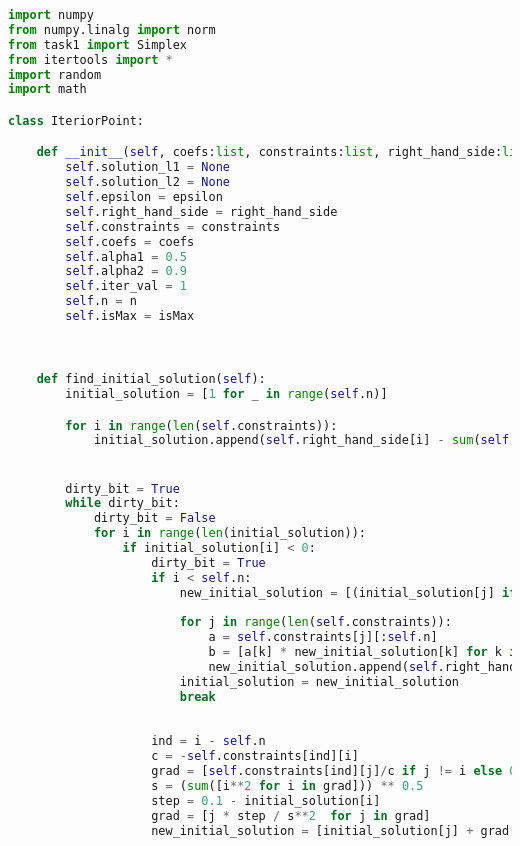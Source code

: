 \documentclass[12pt, legalpaper]{exam}
\begin{document}
\begin{lstlisting}[language=Python, caption=Программа на Python, label=lst:python-code]
import numpy
from numpy.linalg import norm
from task1 import Simplex
from itertools import *
import random
import math

class IteriorPoint:

    def __init__(self, coefs:list, constraints:list, right_hand_side:list, epsilon:int, n:int, isMax:bool):
        self.solution_l1 = None
        self.solution_l2 = None
        self.epsilon = epsilon
        self.right_hand_side = right_hand_side
        self.constraints = constraints
        self.coefs = coefs
        self.alpha1 = 0.5
        self.alpha2 = 0.9
        self.iter_val = 1
        self.n = n
        self.isMax = isMax

    

    def find_initial_solution(self):
        initial_solution = [1 for _ in range(self.n)]

        for i in range(len(self.constraints)):
            initial_solution.append(self.right_hand_side[i] - sum(self.constraints[i][:self.n]))


        dirty_bit = True
        while dirty_bit:
            dirty_bit = False
            for i in range(len(initial_solution)):
                if initial_solution[i] < 0:
                    dirty_bit = True
                    if i < self.n:
                        new_initial_solution = [(initial_solution[j] if j!=i else 0) for j in range(self.n)]
                        
                        for j in range(len(self.constraints)):
                            a = self.constraints[j][:self.n]
                            b = [a[k] * new_initial_solution[k] for k in range(len(a))]
                            new_initial_solution.append(self.right_hand_side[j] - sum(b))
                        initial_solution = new_initial_solution
                        break
                    
                    
                    ind = i - self.n
                    c = -self.constraints[ind][i]
                    grad = [self.constraints[ind][j]/c if j != i else 0  for j in range(len(self.constraints[ind]))] # + [self.right_hand_side[ind]]
                    s = (sum([i**2 for i in grad])) ** 0.5
                    step = 0.1 - initial_solution[i]
                    grad = [j * step / s**2  for j in grad]
                    new_initial_solution = [initial_solution[j] + grad[j] for j in range(self.n)]


\end{lstlisting}
\end{document}
